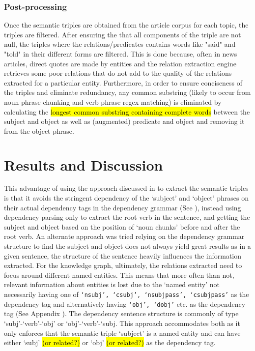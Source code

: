 \subsubsection{Post-processing}
Once the semantic triples are obtained from the article corpus for each topic, the triples are filtered. After ensuring the that all components of the triple are not null, the triples where the relations/predicates contains words like "said" and "told" in their different forms are filtered. This is done because, often in news articles, direct quotes are made by entities and the relation extraction engine retrieves some poor relations that do not add to the quality of the relations extracted for a particular entity. Furthermore, in order to ensure conciseness of the triples and eliminate redundancy, any common substring (likely to occur from noun phrase chunking and verb phrase regex matching) is eliminated by calculating the \hl{longest common substring containing complete words} between the subject and object as well as (augmented) predicate and object and removing it from the object phrase. 


\section{Results and Discussion}


This advantage of using the approach discussed in  to extract the semantic triples is that it avoids the stringent dependency of the `subject' and `object' phrases on their actual dependency tags in the dependency grammar (See ), instead using dependency parsing only to extract the root verb in the sentence, and getting the subject and object based on the position of `noun chunks' before and after the root verb. An alternate approach was tried relying on the dependency grammar structure to find the subject and object does not always yield great results as in a given sentence, the structure of the sentence heavily influences the information extracted. For the knowledge graph, ultimately, the relations extracted need to focus around different named entities. This means that more often than not, relevant information about entities is lost due to the `named entity' not necessarily having one of \texttt{`nsubj', `csubj', `nsubjpass',	`csubjpass'} as the dependency tag and alternatively having \texttt{`obj', `dobj'} etc. as the dependency tag (See Appendix ). The dependency sentence structure is commonly of type `subj'-`verb'-`obj' or `obj'-`verb'-`subj. This approach accommodates both as it only enforces that the semantic triple `subject' is a named entity and can have either `subj' \hl{(or related?)} or `obj' \hl{(or related?)} as the dependency tag. 



